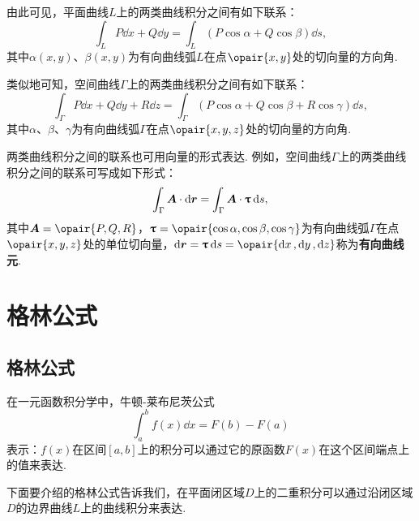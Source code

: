 由此可见，平面曲线\(L\)上的两类曲线积分之间有如下联系：
\begin{equation}\label{equation:线积分与面积分.平面曲线上两类曲线积分之间的联系}
\int_L{P\dd{x}+Q\dd{y}}
=\int_L{(P\cos\alpha+Q\cos\beta)\dd{s}},
\end{equation}
其中\(\alpha(x,y)\)、\(\beta(x,y)\)为有向曲线弧\(L\)在点\(\opair{x,y}\)处的切向量的方向角.

类似地可知，空间曲线\(\Gamma\)上的两类曲线积分之间有如下联系：
\begin{equation}\label{equation:线积分与面积分.空间曲线上两类曲线积分之间的联系}
\int_{\Gamma}{P\dd{x}+Q\dd{y}+R\dd{z}}
=\int_{\Gamma}{(P\cos\alpha+Q\cos\beta+R\cos\gamma)\dd{s}},
\end{equation}其中\(\alpha\)、\(\beta\)、\(\gamma\)为有向曲线弧\(\Gamma\)在点\(\opair{x,y,z}\)处的切向量的方向角.

两类曲线积分之间的联系也可用向量的形式表达.
例如，空间曲线\(\Gamma\)上的两类曲线积分之间的联系可写成如下形式：
\begin{equation}\label{equation:线积分与面积分.空间曲线上两类曲线积分之间的联系的向量形式}
\int_{\Gamma}{\boldsymbol{A} \cdot \dd{\boldsymbol{r}}}
= \int_{\Gamma}{\boldsymbol{A} \cdot \boldsymbol{\uptau} \dd{s}},
\end{equation}其中\(\mat{A}=\opair{P,Q,R}\)，\(\mat{\tau}=\opair{\cos\alpha,\cos\beta,\cos\gamma}\)为有向曲线弧\(\Gamma\)在点\(\opair{x,y,z}\)处的单位切向量，\(\dd{\mat{r}}=\mat{\tau}\dd{s}=\opair{\dd{x},\dd{y},\dd{z}}\)称为\textbf{有向曲线元}.

\section{格林公式}
\subsection{格林公式}
在一元函数积分学中，牛顿-莱布尼茨公式\[
\int_a^b f(x) \dd{x} = F(b) - F(a)
\]表示：\(f(x)\)在区间\([a,b]\)上的积分可以通过它的原函数\(F(x)\)在这个区间端点上的值来表达.

下面要介绍的格林公式告诉我们，在平面闭区域\(D\)上的二重积分可以通过沿闭区域\(D\)的边界曲线\(L\)上的曲线积分来表达.

